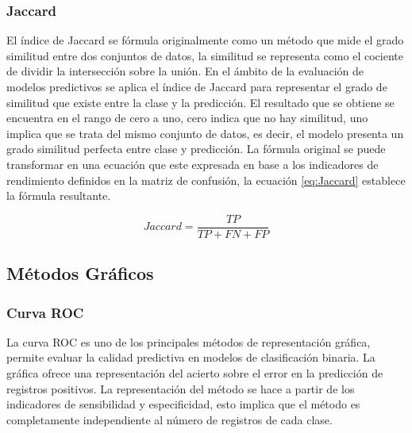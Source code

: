 
\subsubsection{Jaccard}

El índice de Jaccard \cite{jaccard1912} se fórmula originalmente como un método que mide el grado similitud entre dos conjuntos de datos, la similitud se representa como el cociente de dividir la intersección sobre la unión. En el ámbito de la evaluación de modelos predictivos se aplica el índice de Jaccard para representar el grado de similitud que existe entre la clase y la predicción. El resultado que se obtiene se encuentra en el rango de cero a uno, cero indica que no hay similitud, uno implica que se trata del mismo conjunto de datos, es decir, el modelo presenta un grado similitud perfecta entre clase y predicción. La fórmula original se puede transformar en una ecuación que este expresada en base a los indicadores de rendimiento definidos en la matriz de confusión, la ecuación \ref{eq:Jaccard} establece la fórmula resultante.

\bigbreak

\begin{equation}
    Jaccard = \frac{TP}{TP+FN+FP}
    \label{eq:Jaccard}
\end{equation}

\clearpage

\subsection{Métodos Gráficos}

\subsubsection{Curva ROC}

La curva ROC \cite{ROC2006} es uno de los principales métodos de representación gráfica, permite evaluar la calidad predictiva en modelos de clasificación binaria. La gráfica ofrece una representación del acierto sobre el error en la predicción de registros positivos. La representación del método se hace a partir de los indicadores de sensibilidad y especificidad, esto implica que el método es completamente independiente al número de registros de cada clase.

\bigbreak

